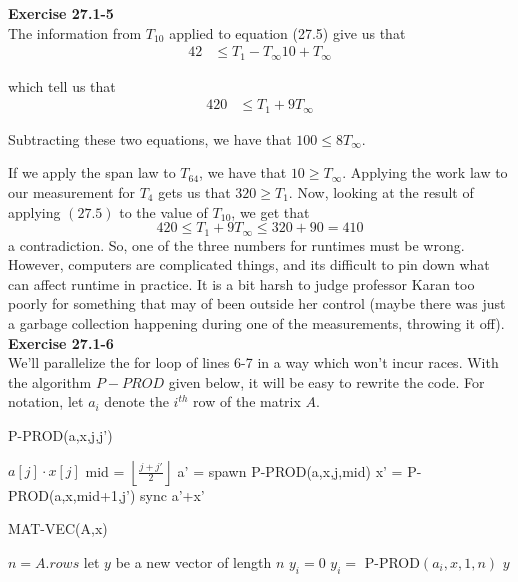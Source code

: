 \documentclass{article}
\begin{document}
\noindent\textbf{Exercise 27.1-5}\\

The information from $T_{10}$ applied to equation (27.5) give us that
\begin{align*}
42 &\le {T_1 - T_\infty}{10} + T_\infty
\end{align*}

which tell us that 
\begin{align*}
420 &\le T_1 +9 T_\infty
\end{align*}


Subtracting these two equations, we have that $100 \le 8 T_\infty$.

If we apply the span law to $T_64$, we have that $10\ge T_\infty$. Applying the work law to our measurement for $T_4$ gets us that $320 \ge  T_1$. Now, looking at the result of applying $(27.5)$ to the value of $T_10$, we get that
\[
420 \le T_1 + 9T_\infty \le 320 + 90 = 410
\]
a contradiction. So, one of the three numbers for runtimes must be wrong. However, computers are complicated things, and its difficult to pin down what can affect runtime in practice. It is a bit harsh to judge professor Karan too poorly for something that may of been outside her control (maybe there was just a garbage collection happening during one of the measurements, throwing it off).\\

\noindent\textbf{Exercise 27.1-6}\\

We'll parallelize the for loop of lines 6-7 in a way which won't incur races.  With the algorithm $P-PROD$ given below, it will be easy to rewrite the code.  For notation, let $a_i$ denote the $i^{th}$ row of the matrix $A$.

\begin{algorithm}
\caption{P-PROD(a,x,j,j')}
\begin{algorithmic}[1]
\State \Return  $a[j] \cdot x[j]$
\EndIf
\State mid = $\left\lfloor \frac{j+j'}{2}\right\rfloor$
\State a' = spawn P-PROD(a,x,j,mid)
\State x' = P-PROD(a,x,mid+1,j')
\State sync
\State \Return a'+x'
\end{algorithmic}
\end{algorithm}

\begin{algorithm}
\caption{MAT-VEC(A,x)}
\begin{algorithmic}[1]
\State $n=A.rows$
\State let $y$ be a new vector of length $n$
	\State $y_i = 0$
\EndParFor
{}
	\State $y_i = $ P-PROD$(a_i, x, 1, n)$
\EndParFor
\State \Return $y$
\end{algorithmic}
\end{algorithm}
\end{document}
